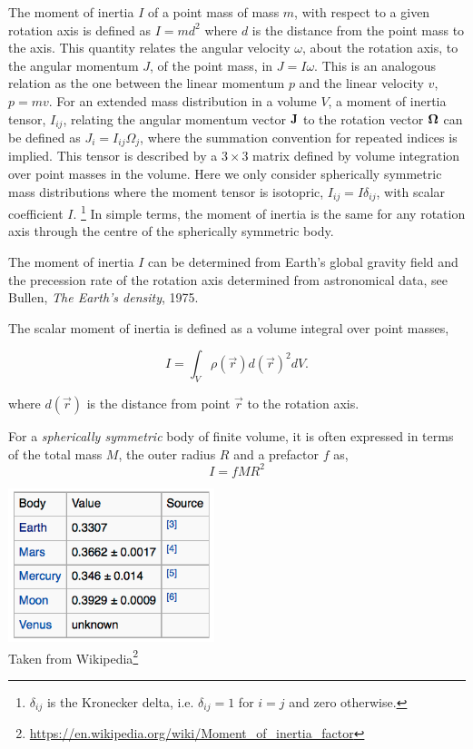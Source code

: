 
The moment of inertia $I$ of a point mass of mass $m$,
with respect to a given rotation axis is defined as $I = m d^2$
where $d$ is the distance from the point mass to the axis.
This quantity relates the angular velocity $\omega$, 
about the rotation axis,
to the angular momentum $J$, of the point mass, in $J = I \omega$.
This is an analogous relation as the one between the linear momentum $p$
and the linear velocity $v$, $p = m v$. 
For an extended mass distribution in a volume $V$,
a moment of inertia tensor, $I_{ij}$,
relating the angular momentum vector ${\bf J}$ to the rotation vector ${\bf \Omega}$
can be defined as $J_i = I_{ij} \Omega_j$, where the summation convention for repeated
indices is implied.
This tensor is described by a $3 \times 3$ matrix defined by volume integration
over point masses in the volume.
Here we only consider spherically symmetric mass distributions where
the moment tensor is isotopric, $I_{ij} = I \delta_{ij}$,
with scalar coefficient $I$.
\footnote{
$\delta_{ij}$ is the Kronecker delta, i.e. $\delta_{ij}=1$ for
$i=j$ and zero otherwise. }
In simple terms, the moment of inertia is the same for any rotation axis
through the centre of the spherically symmetric body.

The moment of inertia $I$ can be determined from Earth's global gravity
field and the precession rate of the rotation axis determined 
from astronomical data, see Bullen, {\it The Earth's density}, 1975.


The scalar moment of inertia is defined as
a volume integral over point masses,
\begin{mdframed}[backgroundcolor=blue!5]
\[
I = \int_V \rho(\vec{r}) d(\vec r)^2 dV.
\]
\end{mdframed}
where $d(\vec r)$ is the distance from point $\vec{r}$ to the rotation axis.

For a {\it spherically symmetric} body of finite volume, 
it is often expressed in terms of the total mass $M$, the outer radius $R$ 
and a prefactor $f$ as,
\begin{equation}
\boxed{    I = f M R^2}
\label{def_momint_prefact}
\end{equation}

\begin{center}
\includegraphics[width=6cm]{images/gravity/moments}\\
{\captionfont Taken from Wikipedia\footnote{\url{https://en.wikipedia.org/wiki/Moment_of_inertia_factor}}}
\end{center}

